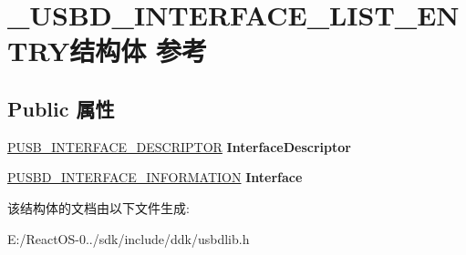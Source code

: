 \hypertarget{struct___u_s_b_d___i_n_t_e_r_f_a_c_e___l_i_s_t___e_n_t_r_y}{}\section{\+\_\+\+U\+S\+B\+D\+\_\+\+I\+N\+T\+E\+R\+F\+A\+C\+E\+\_\+\+L\+I\+S\+T\+\_\+\+E\+N\+T\+R\+Y结构体 参考}
\label{struct___u_s_b_d___i_n_t_e_r_f_a_c_e___l_i_s_t___e_n_t_r_y}
\subsection*{Public 属性}
\begin{DoxyCompactItemize}
\item 
\mbox{\label{struct___u_s_b_d___i_n_t_e_r_f_a_c_e___l_i_s_t___e_n_t_r_y_aebd9988fd99f5ef9506f976bdf7b733a}} 
\hyperlink{struct___u_s_b___i_n_t_e_r_f_a_c_e___d_e_s_c_r_i_p_t_o_r}{P\+U\+S\+B\+\_\+\+I\+N\+T\+E\+R\+F\+A\+C\+E\+\_\+\+D\+E\+S\+C\+R\+I\+P\+T\+OR} {\bfseries Interface\+Descriptor}
\item 
\mbox{\label{struct___u_s_b_d___i_n_t_e_r_f_a_c_e___l_i_s_t___e_n_t_r_y_a80192ed65237015b8333d50c97371265}} 
\hyperlink{struct___u_s_b_d___i_n_t_e_r_f_a_c_e___i_n_f_o_r_m_a_t_i_o_n}{P\+U\+S\+B\+D\+\_\+\+I\+N\+T\+E\+R\+F\+A\+C\+E\+\_\+\+I\+N\+F\+O\+R\+M\+A\+T\+I\+ON} {\bfseries Interface}
\end{DoxyCompactItemize}


该结构体的文档由以下文件生成\+:\begin{DoxyCompactItemize}
\item 
E\+:/\+React\+O\+S-\/0../sdk/include/ddk/usbdlib.\+h\end{DoxyCompactItemize}
